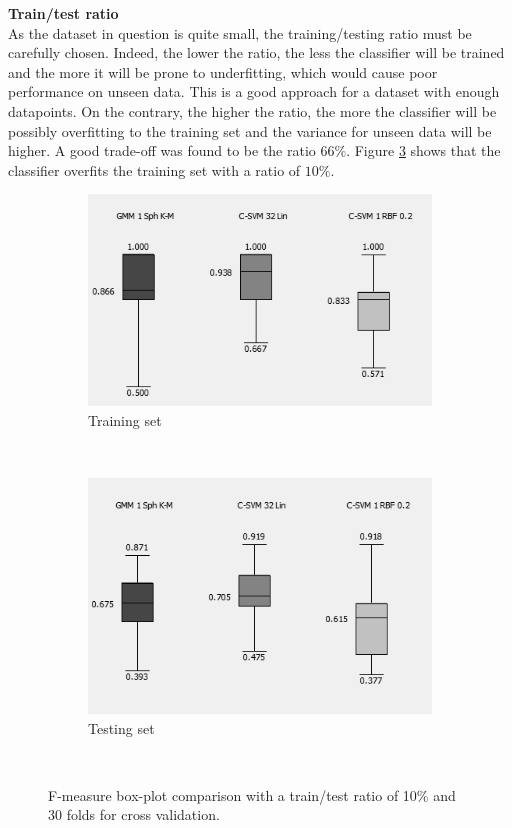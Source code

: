 \documentclass[a4paper,10pt]{article}
\begin{document}
\textbf{Train/test ratio}\\
As the dataset in question is quite small, the training/testing ratio must be carefully chosen. Indeed, the lower the ratio, the less the classifier will be trained and the more it will be prone to underfitting, which would cause poor performance on unseen data. This is a good approach for a dataset with enough datapoints. On the contrary, the higher the ratio, the more the classifier will be possibly overfitting to the training set and the variance for unseen data will be higher. A good trade-off was found to be the ratio $66\%$. Figure \ref{fig:robustness-train-ratio} shows that the classifier overfits the training set with a ratio of $10\%$.

\begin{figure}[H]
\centering
	\begin{subfigure}[t]{0.3\textwidth} \label{fig:best-GMM}
      \centering
      \includegraphics[height=3.2 cm]{pictures/train-test-ratio-low-10percent-train-data}
      \caption{Training set}
      \label{fig:train-test-ratio-low-10percent-train-data}
    \end{subfigure}%
    ~
    \begin{subfigure}[t]{0.3\textwidth} \label{fig:best-SVM}
      \centering
      \includegraphics[height=3.2 cm]{pictures/train-test-ratio-low-10percent-test-data}
      \caption{Testing set}
      \label{fig:train-test-ratio-low-10percent-train-data}
     \end{subfigure}
      ~
     \caption{F-measure box-plot comparison with a train/test ratio of 10\% and 30 folds for cross validation.}
     \label{fig:robustness-train-ratio}
\end{figure}
\end{document}
